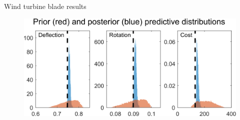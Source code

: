\documentclass[final]{beamer}
\newlength{\onecolwid}
\newlength{\twocolwid}
\begin{document}
\begin{frame}[t]
\begin{columns}[t]
\begin{column}{\twocolwid}
\begin{columns}[t,totalwidth=\twocolwid]
\begin{column}{\onecolwid}
\begin{alertblock}{Wind turbine blade results}
\begin{figure}[h!]
\includegraphics[width=.95\linewidth]{FIG_prior_vs_posterior_dist}
\label{blade}
\end{figure}


\end{alertblock}


\end{column} %

\end{columns} %








\begin{columns}[t,totalwidth=\twocolwid] %

\begin{column}{\onecolwid} %


\end{column}
\end{columns}
\end{column}
\end{columns}
\end{frame}
\end{document}
